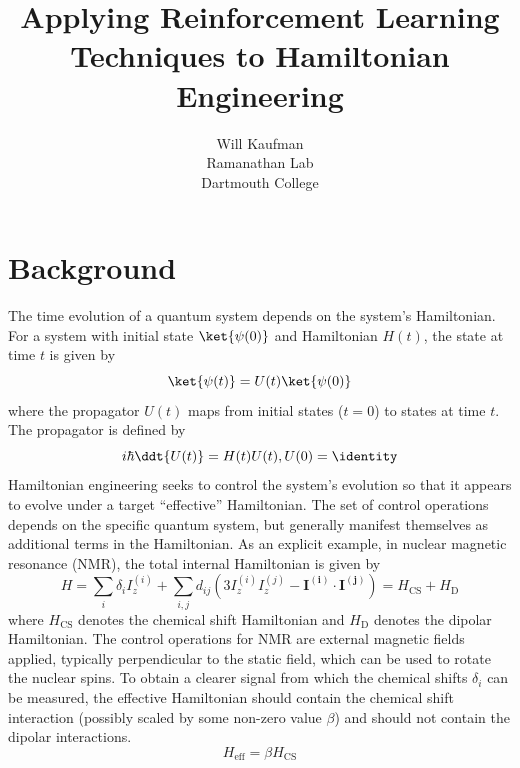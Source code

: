 \documentclass{article}
\title{Applying Reinforcement Learning Techniques to Hamiltonian Engineering}
\author{Will Kaufman \\ Ramanathan Lab \\ Dartmouth College}
\begin{document}
\maketitle


\section{Background}

The time evolution of a quantum system depends on the system's Hamiltonian. For a system with initial state $\ket{\psi(0)}$ and Hamiltonian $H(t)$, the state at time $t$ is given by
\[
\ket{\psi(t)} = U(t)\ket{\psi(0)}
\]
where the propagator $U(t)$ maps from initial states ($t=0$) to states at time $t$. The propagator is defined by
\begin{equation}
    i\hbar \ddt{U(t)} = H(t) U(t), U(0) = \identity
\end{equation}
Hamiltonian engineering seeks to control the system's evolution so that it appears to evolve under a target ``effective'' Hamiltonian. The set of control operations depends on the specific quantum system, but generally manifest themselves as additional terms in the Hamiltonian. As an explicit example, in nuclear magnetic resonance (NMR), the total internal Hamiltonian is given by
\begin{equation}\label{eq:Hint}
    H = \sum_i \delta_i I_z^{(i)} + \sum_{i,j} d_{ij} \left( 3I_z^{(i)}I_z^{(j)} - \mathbf{I^{(i)}} \cdot \mathbf{I^{(j)}} \right) = H_\text{CS} + H_\text{D}
\end{equation}
where $H_\text{CS}$ denotes the chemical shift Hamiltonian and $H_\text{D}$ denotes the dipolar Hamiltonian.
The control operations for NMR are external magnetic fields applied, typically perpendicular to the static field, which can be used to rotate the nuclear spins.
To obtain a clearer signal from which the chemical shifts $\delta_i$ can be measured, the effective Hamiltonian should contain the chemical shift interaction (possibly scaled by some non-zero value $\beta$) and should not contain the dipolar interactions.
\[
H_\text{eff} = \beta H_\text{CS}
\]
\end{document}
